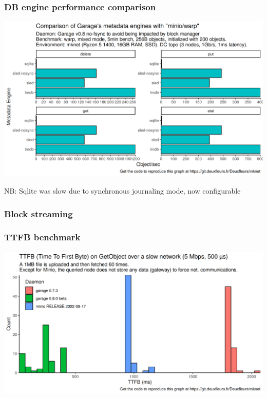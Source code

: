 \documentclass[aspectratio=169]{beamer}
\begin{document}
\begin{frame}
	\frametitle{DB engine performance comparison}
	\begin{center}
		\includegraphics[width=.6\linewidth]{../assets/db_engine.png}
	\end{center}
	NB: Sqlite was slow due to synchronous journaling mode, now configurable
\end{frame}

\begin{frame}
	\frametitle{Block streaming}
	\begin{center}
	\end{center}
\end{frame}

\begin{frame}
	\frametitle{TTFB benchmark}
	\begin{center}
		\includegraphics[width=.8\linewidth]{../assets/ttfb.png}
	\end{center}
\end{frame}
\end{document}
